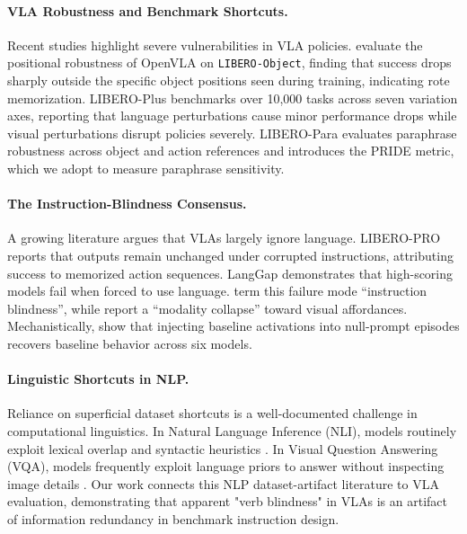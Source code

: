 \documentclass[11pt]{article}
\begin{document}
\paragraph{VLA Robustness and Benchmark Shortcuts.} Recent studies highlight severe vulnerabilities in VLA policies. \citet{pang2025openvla} evaluate the positional robustness of OpenVLA on \texttt{LIBERO-Object}, finding that success drops sharply outside the specific object positions seen during training, indicating rote memorization. LIBERO-Plus \citep{fei2025liberoplus} benchmarks over 10,000 tasks across seven variation axes, reporting that language perturbations cause minor performance drops while visual perturbations disrupt policies severely. LIBERO-Para \citep{kim2026liberopara} evaluates paraphrase robustness across object and action references and introduces the PRIDE metric, which we adopt to measure paraphrase sensitivity.

\paragraph{The Instruction-Blindness Consensus.} A growing literature argues that VLAs largely ignore language. LIBERO-PRO \citep{zhou2025liberopro} reports that outputs remain unchanged under corrupted instructions, attributing success to memorized action sequences. LangGap \citep{hou2026langgap} demonstrates that high-scoring models fail when forced to use language. \citet{zhang2026flatness} term this failure mode ``instruction blindness'', while \citet{zhan2026stable} report a ``modality collapse'' toward visual affordances. Mechanistically, \citet{grant2026features} show that injecting baseline activations into null-prompt episodes recovers baseline behavior across six models.

\paragraph{Linguistic Shortcuts in NLP.} Reliance on superficial dataset shortcuts is a well-documented challenge in computational linguistics. In Natural Language Inference (NLI), models routinely exploit lexical overlap and syntactic heuristics \citep{gururangan2018annotation,mccoy2019right}. In Visual Question Answering (VQA), models frequently exploit language priors to answer without inspecting image details \citep{goyal2017making}. Our work connects this NLP dataset-artifact literature to VLA evaluation, demonstrating that apparent "verb blindness" in VLAs is an artifact of information redundancy in benchmark instruction design.
\end{document}
